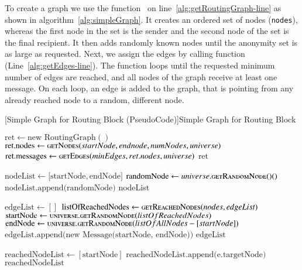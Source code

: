To create a graph we use the function~ on line~\ref{alg:getRoutingGraph-line} as shown in algorithm~\ref{alg:simpleGraph}. It creates an ordered set of nodes (\texttt{nodes}), whereas the first node in the set is the sender and the second node of the set is the final recipient. It then adds randomly known nodes until the anonymity set is as large as requested. Next, we assign the edges by calling function~ (Line~\ref{alg:getEdges-line}). The function loops until the requested minimum number of edges are reached, and all nodes of the graph receive at least one message. On each loop, an edge is added to the graph, that is pointing from any already reached node to a random, different node.

\begin{breakablealgorithm}
	[Simple Graph for Routing Block (PseudoCode)]{Simple Graph for Routing Block}\label{alg:simpleGraph}
	\begin{algorithmic}[1]
		\label{alg:getRoutingGraph-line}
			\State $\text{ret} \gets \text{new RoutingGraph}()$
			\State $\text{ret.nodes} \gets \Call{getNodes}{startNode, endnode, numNodes, universe}$
			\State $\text{ret.messages} \gets \Call{getEdges}{minEdges, ret.nodes, universe}$
			\Return $\text{ret}$	
		\EndFunction
		\item[]		
		\label{alg:getNodes-line}
		  \State $\text{nodeList} \gets \lbrack\text{startNode}, \text{endNode}\rbrack$
		  	\State $\text{randomNode} \gets universe.\Call{getRandomNode()}$
		  		\State $\text{nodeList.append(randomNode)}$ 
		  	\EndIf	
		  \EndWhile{}	
		  \Return nodeList
		\EndFunction  
		\item[]
		\label{alg:getEdges-line}
		    \State $\text{edgeList} \gets []$
				\State $\text{listOfReachedNodes} \gets \Call{getReachedNodes}{nodes, edgeList}$
				\State $\text{startNode} \gets \Call{universe.getRandomNode}{listOfReachedNodes}$
				\State $\text{endNode} \gets \Call{universe.getRandomNode}{listOfAllNodes-[startNode]}$
				\State $\text{edgeList.append(new Message(startNode, endNode))}$
			\EndWhile{}
			\Return $\text{edgeList}$
		\EndFunction
		\item[]
		\label{alg:getReachedNodes-line}
			\State $\text{reachedNodeList} \gets [\text{startNode}]$
					\State $\text{reachedNodeList.append(e.targetNode)}$
				\EndIf
			\EndFor
			\Return $\text{reachedNodeList}$
		\EndFunction
	\end{algorithmic}
\end{breakablealgorithm}

